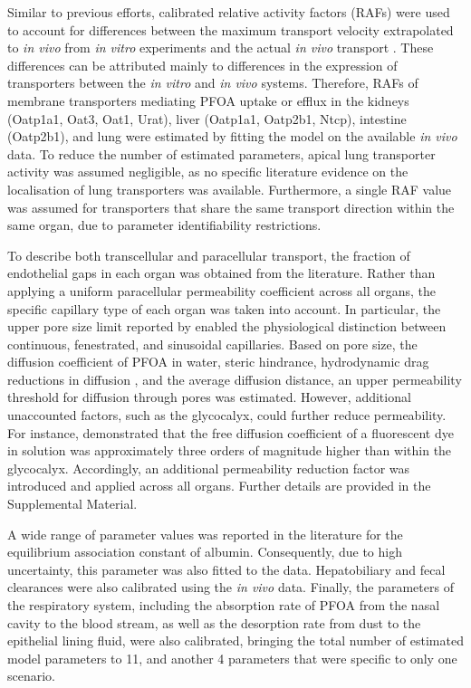 \documentclass[preprint,12pt,authoryear]{elsarticle}
\begin{document}
Similar to previous efforts, calibrated relative activity factors (RAFs) were used to account for differences between the maximum transport velocity extrapolated to \textit{in vivo} from \textit{in vitro} experiments and the actual  \textit{in vivo} transport \citep{worley_2015}. These differences can be attributed mainly to differences in the expression of transporters between the  \textit{in vitro} and  \textit{in vivo} systems. Therefore, RAFs of membrane transporters mediating PFOA uptake or efflux in the kidneys (Oatp1a1, Oat3, Oat1, Urat), liver (Oatp1a1, Oatp2b1, Ntcp), intestine (Oatp2b1), and lung were estimated by fitting the model on the available  \textit{in vivo} data. To reduce the number of estimated parameters, apical lung transporter activity was assumed negligible, as no specific literature evidence on the localisation of lung transporters was available. Furthermore, a single RAF value was assumed for transporters that share the same transport direction within the same organ, due to parameter identifiability restrictions.

To describe both transcellular and paracellular transport, the fraction of endothelial gaps in each organ was obtained from the literature. Rather than applying a uniform paracellular permeability coefficient across all organs, the specific capillary type of each organ was taken into account. In particular, the upper pore size limit reported by \citet{sarin_2010} enabled the physiological distinction between continuous, fenestrated, and sinusoidal capillaries. Based on pore size, the diffusion coefficient of PFOA in water, steric hindrance, hydrodynamic drag reductions in diffusion \citep{renkin_1954}, and the average diffusion distance, an upper permeability threshold for diffusion through pores was estimated. However, additional unaccounted factors, such as the glycocalyx, could further reduce permeability. For instance, \citet{Gao_2010} demonstrated that the free diffusion coefficient of a fluorescent dye in solution was approximately three orders of magnitude higher than within the glycocalyx. Accordingly, an additional permeability reduction factor was introduced and applied across all organs. Further details are provided in the Supplemental Material.

 A wide range of parameter values was reported in the literature for the equilibrium association constant of albumin. Consequently, due to high uncertainty, this parameter was also fitted to the data. Hepatobiliary and fecal clearances were also calibrated using the \textit{in vivo} data. Finally, the parameters of the respiratory system, including the absorption rate of PFOA from the nasal cavity to the blood stream, as well as the desorption rate from dust to the epithelial lining fluid, were also calibrated, bringing the total number of estimated model parameters to 11, and another 4 parameters that were specific to only one scenario.
\end{document}
